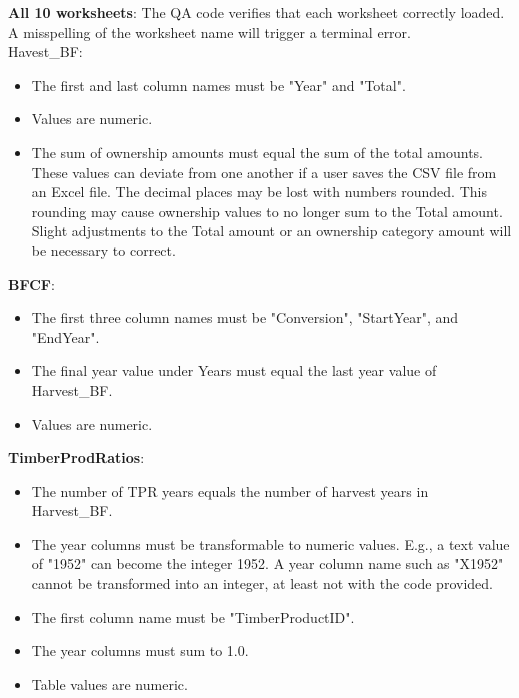 \documentclass[
  openany]{book}
\providecommand{\tightlist}{%
  \setlength{\itemsep}{0pt}\setlength{\parskip}{0pt}}
\begin{document}
\textbf{All 10 worksheets}: The QA code verifies that each worksheet correctly loaded. A misspelling of the worksheet name will trigger a terminal error.\\
Havest\_BF:

\begin{itemize}
\tightlist
\item
  The first and last column names must be "Year" and "Total".\\
\item
  Values are numeric.\\
\item
  The sum of ownership amounts must equal the sum of the total amounts. These values can deviate from one another if a user saves the CSV file from an Excel file. The decimal places may be lost with numbers rounded. This rounding may cause ownership values to no longer sum to the Total amount. Slight adjustments to the Total amount or an ownership category amount will be necessary to correct.
\end{itemize}

\textbf{BFCF}:

\begin{itemize}
\tightlist
\item
  The first three column names must be "Conversion", "StartYear", and "EndYear".\\
\item
  The final year value under Years must equal the last year value of Harvest\_BF.\\
\item
  Values are numeric.
\end{itemize}

\textbf{TimberProdRatios}:

\begin{itemize}
\tightlist
\item
  The number of TPR years equals the number of harvest years in Harvest\_BF.\\
\item
  The year columns must be transformable to numeric values. E.g., a text value of "1952" can become the integer 1952. A year column name such as "X1952" cannot be transformed into an integer, at least not with the code provided.\\
\item
  The first column name must be "TimberProductID".\\
\item
  The year columns must sum to 1.0.\\
\item
  Table values are numeric.
\end{itemize}
\end{document}
